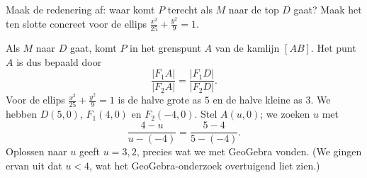 \documentclass{ximera}
\begin{document}
\begin{exercise}
    Maak de redenering af: waar komt \(P\) terecht als \(M\) naar de top \(D\) gaat? Maak
    het ten slotte concreet voor de ellips \(\frac{x^2}{25} + \frac{y^2}{9} = 1\).
    \begin{oplossing}
        Als \(M\) naar \(D\) gaat, komt \(P\) in het grenspunt \(A\) van de kamlijn
        \([AB]\). Het punt \(A\) is dus bepaald door
        \[
            \frac{|F_1 A|}{|F_2 A|} = \frac{|F_1 D|}{|F_2 D|} .
        \]
        Voor de ellips \(\frac{x^2}{25} + \frac{y^2}{9} = 1\) is de halve grote as \(5\) en
        de halve kleine as \(3\). We hebben \(D(5, 0)\), \(F_1(4, 0)\) en \(F_2(-4, 0)\).
        Stel \(A(u, 0)\); we zoeken \(u\) met
        \[
            \frac{4 - u}{u - (-4)} = \frac{5 - 4}{5 - (-4)} .
        \]
        Oplossen naar \(u\) geeft \(u = 3{,}2\), precies wat we met GeoGebra vonden. (We
        gingen ervan uit dat \(u < 4\), wat het GeoGebra-onderzoek overtuigend liet zien.)
    \end{oplossing}
\end{exercise}
\end{document}
